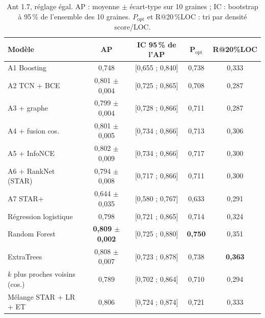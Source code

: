 \documentclass[11pt,a4paper,openany]{report}
\newcommand{\best}[1]{\textbf{\color{primary}#1}}
\begin{document}
\begin{table}[H]
\centering\small
\caption{Ant 1.7, réglage égal. AP : moyenne $\pm$ écart-type sur 10 graines ; IC : bootstrap à 95\,\% de l'ensemble
des 10 graines. $P_{\mathrm{opt}}$ et R@20\,\%LOC : tri par densité score/LOC.}
\label{tab:fair}
\begin{tabular}{lcccc}
\toprule
\textbf{Modèle} & \textbf{AP} & \textbf{IC 95\,\% de l'AP} & $\boldsymbol{P_{\mathrm{opt}}}$ & \textbf{R@20\%LOC} \\
\midrule
A1 Boosting                 & 0,748              & [0,655 ; 0,840] & 0,738 & 0,333 \\
A2 TCN + BCE                & 0,801 $\pm$ 0,004 & [0,725 ; 0,865] & 0,708 & 0,287 \\
A3 + graphe                 & 0,799 $\pm$ 0,004 & [0,728 ; 0,866] & 0,711 & 0,287 \\
A4 + fusion cos.            & 0,801 $\pm$ 0,005 & [0,734 ; 0,866] & 0,713 & 0,306 \\
A5 + InfoNCE                & 0,802 $\pm$ 0,009 & [0,734 ; 0,866] & 0,717 & 0,300 \\
A6 + RankNet (STAR)         & 0,794 $\pm$ 0,008 & [0,717 ; 0,866] & 0,711 & 0,300 \\
A7 STAR+                    & 0,644 $\pm$ 0,035 & [0,580 ; 0,767] & 0,633 & 0,291 \\
Régression logistique       & 0,798              & [0,721 ; 0,865] & 0,714 & 0,324 \\
Random Forest               & \best{0,809 $\pm$ 0,002} & [0,725 ; 0,880] & \best{0,750} & 0,351 \\
ExtraTrees                  & 0,808 $\pm$ 0,007 & [0,723 ; 0,878] & 0,738 & \best{0,363} \\
$k$ plus proches voisins (cos.) & 0,789          & [0,702 ; 0,864] & 0,710 & 0,294 \\
Mélange STAR + LR + ET      & 0,806              & [0,724 ; 0,874] & 0,721 & 0,333 \\
\bottomrule
\end{tabular}
\end{table}
\end{document}
